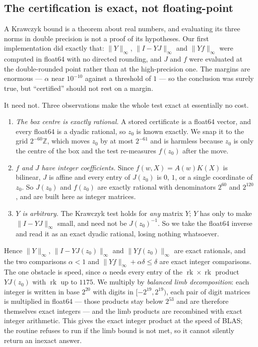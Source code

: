 \documentclass[11pt]{article}
\theoremstyle{definition}
\begin{document}
\subsection*{The certification is exact, not floating-point}
\label{sec:exact}
A Krawczyk bound is a theorem about real numbers, and evaluating its three norms
in double precision is not a proof of its hypotheses. Our first implementation
did exactly that: $\|Y\|_\infty$, $\|I-YJ\|_\infty$ and $\|Yf\|_\infty$ were
computed in float64 with no directed rounding, and $J$ and $f$ were evaluated at
the double-rounded point rather than at the high-precision one. The margins are
enormous --- $\alpha$ near $10^{-10}$ against a threshold of $1$ --- so the
conclusion was surely true, but ``certified'' should not rest on a margin.

It need not. Three observations make the whole test exact at essentially no
cost.

\begin{enumerate}
\item \emph{The box centre is exactly rational.} A stored certificate is a
float64 vector, and every float64 is a dyadic rational, so $z_0$ is known
exactly. We snap it to the grid $2^{-60}\mathbb Z$, which moves $z_0$ by at most
$2^{-61}$ and is harmless because $z_0$ is only the centre of the box and the
test re-measures $f(z_0)$ after the move.
\item \emph{$f$ and $J$ have integer coefficients.} Since $f(w,X)=A(w)K(X)$ is
bilinear, $J$ is affine and every entry of $J(z_0)$ is $0$, $1$, or a single
coordinate of $z_0$. So $J(z_0)$ and $f(z_0)$ are exactly rational with
denominators $2^{60}$ and $2^{120}$, and are built here as integer matrices.
\item \emph{$Y$ is arbitrary.} The Krawczyk test holds for \emph{any} matrix
$Y$; $Y$ has only to make $\|I-YJ\|_\infty$ small, and need not be
$J(z_0)^{-1}$. So we take the float64 inverse and read it as an exact dyadic
rational, losing nothing whatsoever.
\end{enumerate}

\noindent
Hence $\|Y\|_\infty$, $\|I-YJ(z_0)\|_\infty$ and $\|Yf(z_0)\|_\infty$ are exact
rationals, and the two comparisons $\alpha<1$ and
$\|Yf\|_\infty+\alpha\delta\le\delta$ are exact integer comparisons. The one
obstacle is speed, since $\alpha$ needs every entry of the $\operatorname{rk}
\times\operatorname{rk}$ product $YJ(z_0)$ with $\operatorname{rk}$ up to
$1175$. We multiply by \emph{balanced limb decomposition}: each integer is
written in base $2^{20}$ with digits in $[-2^{19},2^{19})$, each pair of digit
matrices is multiplied in float64 --- those products stay below $2^{53}$ and are
therefore themselves exact integers --- and the limb products are recombined
with exact integer arithmetic. This gives the exact integer product at the speed
of BLAS; the routine refuses to run if the limb bound is not met, so it cannot
silently return an inexact answer.
\end{document}
